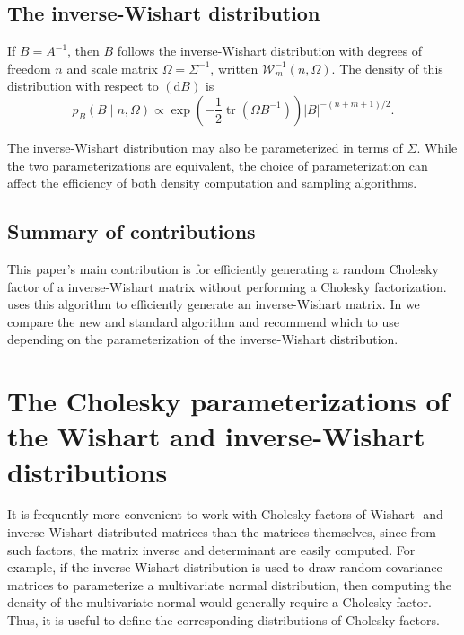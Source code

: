 \documentclass[12pt,a4paper,reqno]{amsart}
\numberwithin{equation}{section}
\newcommand{\invwishart}[1]{\mathcal{W}^{-1}_{#1}}
\renewcommand{\det}[1]{\left| {#1} \right|}
\newcommand{\dmeasure}[1]{\left(\dd{#1}\right)}
\newcommand{\dd}[1]{\mathrm{d}{#1}}
\newcommand{\tr}{\operatorname{tr}}
\begin{document}
\subsection*{The inverse-Wishart distribution}

If $B=A^{-1}$, then $B$ follows the inverse-Wishart distribution with degrees of freedom $n$ and scale matrix $\Omega = \Sigma^{-1}$, written $\invwishart{m}(n, \Omega)$.
The density of this distribution with respect to $\dmeasure{B}$ is
\begin{equation}\label{invwishartdensity}
    p_B(B \mid n, \Omega) \propto \exp\left(-\frac{1}{2}\tr(\Omega B^{-1})\right) \det{B}^{-(n+m+1)/2}.
\end{equation}

The inverse-Wishart distribution may also be parameterized in terms of $\Sigma$.
While the two parameterizations are equivalent, the choice of parameterization can affect the efficiency of both density computation and sampling algorithms.

\subsection*{Summary of contributions}

This paper's main contribution is  for efficiently generating a random Cholesky factor of a inverse-Wishart matrix without performing a Cholesky factorization.
\sloppy
{} uses this algorithm to efficiently generate an inverse-Wishart matrix.
In  we compare the new and standard algorithm and recommend which to use depending on the parameterization of the inverse-Wishart distribution.

\section{The Cholesky parameterizations of the Wishart and inverse-Wishart distributions}

It is frequently more convenient to work with Cholesky factors of Wishart- and inverse-Wishart-distributed matrices than the matrices themselves, since from such factors, the matrix inverse and determinant are easily computed.
For example, if the inverse-Wishart distribution is used to draw random covariance matrices to parameterize a multivariate normal distribution, then computing the density of the multivariate normal would generally require a Cholesky factor.
Thus, it is useful to define the corresponding distributions of Cholesky factors.
\end{document}
